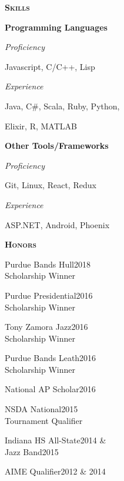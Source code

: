 \documentclass[11pt]{article}
\newcommand{\sectionfont}{\Large\scshape\bfseries\color{cg505green}}
\begin{document}
\begin{minipage}[t]{0.3\textwidth}
  {\sectionfont Skills}

  \textbf{Programming Languages}
  \begin{adjustwidth}{10pt}{}
    \emph{Proficiency}

    \quad Javascript, C/C++, Lisp

    \emph{Experience}

    \quad Java, C\#, Scala, Ruby, Python,

    \quad Elixir, R, MATLAB
  \end{adjustwidth}

  \textbf{Other Tools/Frameworks}
  \begin{adjustwidth}{10pt}{}
    \emph{Proficiency}

    \quad Git, Linux, React, Redux

    \emph{Experience}

    \quad ASP.NET, Android, Phoenix
  \end{adjustwidth}

  \vspace{5pt}

  {\sectionfont Honors}
  \begin{adjustwidth}{10pt}{}
    Purdue Bands Hull\hfill 2018\\
    Scholarship Winner

    Purdue Presidential\hfill 2016\\
    Scholarship Winner

    Tony Zamora Jazz\hfill 2016\\
    Scholarship Winner

    Purdue Bands Leath\hfill 2016\\
    Scholarship Winner

    National AP Scholar\hfill 2016

    NSDA National\hfill 2015\\
    Tournament Qualifier

    Indiana HS All-State\hfill 2014 \&\\
    Jazz Band\hfill 2015

    AIME Qualifier\hfill 2012 \& 2014
  \end{adjustwidth}
\end{minipage}
\hfill\vrule\hfill{}
\end{document}
